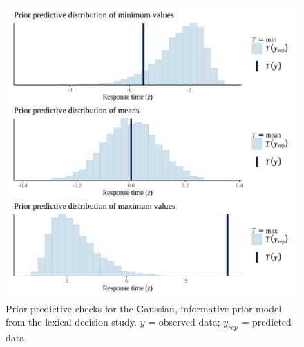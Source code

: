 \documentclass[
  12pt,
  man,floatsintext]{apa7}
\begin{document}
\begin{figure}

{\centering \includegraphics[width=0.8\linewidth]{../lexicaldecision/bayesian_analysis/prior_predictive_checks/plots/lexicaldecision_priorpredictivecheck_informativepriors} 

}

\caption{Prior predictive checks for the Gaussian, informative prior model from the lexical decision study. \(y\) = observed data; \(y_{rep}\) = predicted data.}\label{fig:lexicaldecision-priorpredictivecheck-informativepriors}
\end{figure}
\end{document}
